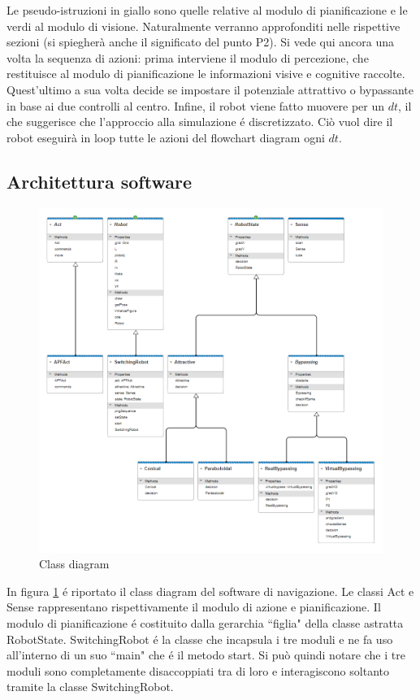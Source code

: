 \documentclass[14pt,a4paper]{extarticle}
\begin{document}
Le pseudo-istruzioni in giallo sono quelle relative al modulo di pianificazione e le verdi al modulo di visione. Naturalmente verranno approfonditi nelle rispettive sezioni (si spiegherà anche il significato del punto P2). Si vede qui ancora una volta la sequenza di azioni: prima interviene il modulo di percezione, che restituisce al modulo di pianificazione le informazioni visive e cognitive raccolte. Quest'ultimo a sua volta decide se impostare il potenziale attrattivo o bypassante in base ai due controlli al centro. Infine, il robot viene fatto muovere per un \(dt\), il che suggerisce che l'approccio alla simulazione é discretizzato. Ciò vuol dire il robot eseguirà in loop tutte le azioni del flowchart diagram ogni \(dt\).

\subsection{Architettura software}
\begin{figure}[H]
\centering
\caption{Class diagram}
\label{classdiagram}
\includegraphics[width=\textwidth]{classDiagram.png}
\end{figure}
In figura \ref{classdiagram} é riportato il class diagram del software di navigazione. Le classi Act e Sense rappresentano rispettivamente il modulo di azione e pianificazione. Il modulo di pianificazione é costituito dalla gerarchia ``figlia" della classe astratta RobotState. SwitchingRobot é la classe che incapsula i tre moduli e ne fa uso all'interno di un suo ``main" che é il metodo start. Si può quindi notare che i tre moduli sono completamente disaccoppiati tra di loro e interagiscono soltanto tramite la classe SwitchingRobot.\\
\end{document}
